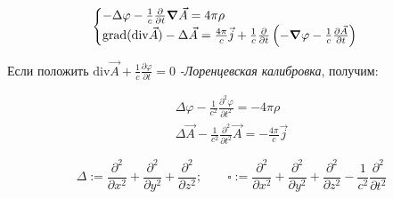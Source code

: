 \[
\begin{cases}
    -\Delta\varphi-\frac{1}{c}\frac{\partial}{\partial t}\grad \vec{A}=4\pi\rho \\
    \mathrm{grad }(\mathrm{div} \vec{A})-\Delta \vec{A} =\frac{4\pi}{c}\vec{j}+\frac{1}{c}  \frac{\partial }{\partial t} \left( -\grad\varphi -\frac{1}{c} \frac{\partial \vec{A}}{\partial t}  \right)   
\end{cases}
\]

Если положить \( \mathrm{div}\vec{A}+\frac{1}{c} \frac{\partial\varphi}{\partial t}=0    \) \textit{-Лоренцевская калибровка}, получим:

\begin{gather*}
    \Delta\varphi-\frac{1}{c^2} \frac{\partial^2\varphi}{\partial t^2} =-4\pi\rho \\
    \Delta\vec{A}-\frac{1}{c^2} \frac{\partial^2}{\partial t^2}\vec{A}=-\frac{4\pi}{c}\vec{j}    
\end{gather*}

\[
\Delta:= \frac{\partial^2}{\partial x^2}+\frac{\partial^2}{\partial y^2} +\frac{\partial^2}{\partial z^2} ;\qquad \square :=\frac{\partial^2}{\partial x^2}+\frac{\partial^2}{\partial y^2} +\frac{\partial^2}{\partial z^2}-\frac{1}{c^2} \frac{\partial^2}{\partial t^2}
\]